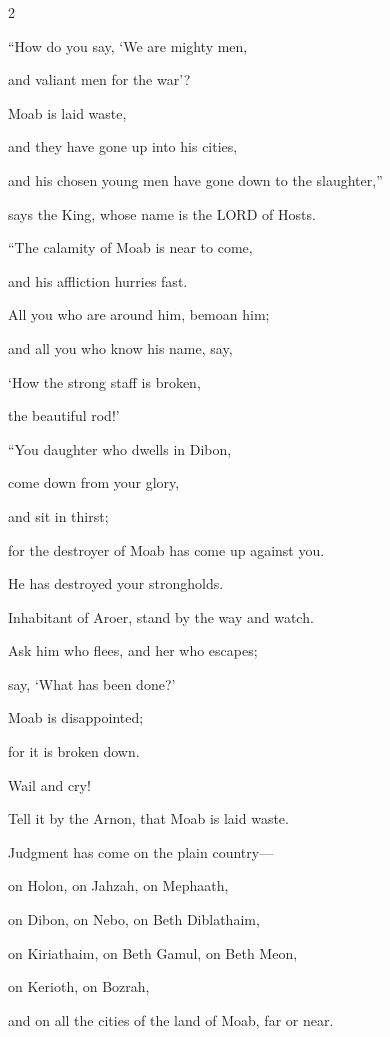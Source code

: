 \begin{multicols}{2}
\vspace{\baselineskip}

\myverse{}“How do you say, ‘We are mighty men,

and valiant men for the war’?


\myverse{}Moab is laid waste,

and they have gone up into his cities,

and his chosen young men have gone down to the slaughter,”

says the King, whose name is the LORD of Hosts.


\myverse{}“The calamity of Moab is near to come,

and his affliction hurries fast.


\myverse{}All you who are around him, bemoan him;

and all you who know his name, say,

‘How the strong staff is broken,

the beautiful rod!’

\vspace{\baselineskip}

\myverse{}“You daughter who dwells in Dibon,

come down from your glory,

and sit in thirst;

for the destroyer of Moab has come up against you.

He has destroyed your strongholds.


\myverse{}Inhabitant of Aroer, stand by the way and watch.

Ask him who flees, and her who escapes;

say, ‘What has been done?’


\myverse{}Moab is disappointed;

for it is broken down.

Wail and cry!

Tell it by the Arnon, that Moab is laid waste.


\myverse{}Judgment has come on the plain country—

on Holon, on Jahzah, on Mephaath,


\myverse{}on Dibon, on Nebo, on Beth Diblathaim,


\myverse{}on Kiriathaim, on Beth Gamul, on Beth Meon,


\myverse{}on Kerioth, on Bozrah,

and on all the cities of the land of Moab, far or near.



\end{multicols}

